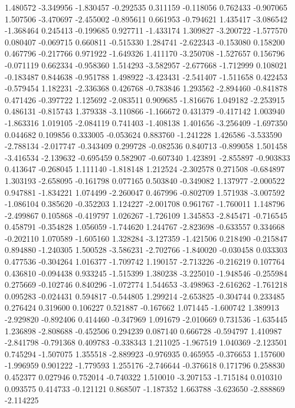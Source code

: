 1.480572
-3.349956
-1.830457
-0.292535
0.311159
-0.118056
0.762433
-0.907065
1.507506
-3.470697
-2.455002
-0.895611
0.661953
-0.794621
1.435417
-3.086542
-1.368464
0.245413
-0.199685
0.927711
-1.433174
1.309827
-3.200722
-1.577570
0.080407
-0.069715
0.660811
-0.515330
1.284741
-2.622343
-0.153080
0.158200
0.467796
-0.217766
0.971922
-1.649326
1.411170
-3.250708
-1.527657
0.156796
-0.071119
0.662334
-0.958360
1.514293
-3.582957
-2.677668
-1.712999
0.108021
-0.183487
0.844638
-0.951788
1.498922
-3.423431
-2.541407
-1.511658
0.422453
-0.579454
1.182231
-2.336368
0.426768
-0.783846
1.293562
-2.894460
-0.841878
0.471426
-0.397722
1.125692
-2.083511
0.909685
-1.816676
1.049182
-2.253915
0.486131
-0.815743
1.379338
-3.110866
-1.166672
0.431379
-0.417142
1.003940
-1.863316
1.019105
-2.084119
0.741403
-1.408138
1.401656
-3.256409
-1.697350
0.044682
0.109856
0.333005
-0.053624
0.883760
-1.241228
1.426586
-3.533590
-2.788134
-2.017747
-0.343409
0.299728
-0.082536
0.840713
-0.899058
1.501458
-3.416534
-2.139632
-0.695459
0.582907
-0.607340
1.423891
-2.855897
-0.903833
0.413647
-0.268045
1.111140
-1.818148
1.212524
-2.302578
0.271508
-0.684897
1.303193
-2.658095
-0.161798
0.077165
0.503840
-0.349082
1.137977
-2.000522
0.947881
-1.834221
1.074499
-2.260047
0.467996
-0.802709
1.571938
-3.007592
-1.086104
0.385620
-0.352203
1.124227
-2.001708
0.961767
-1.760011
1.148796
-2.499867
0.105868
-0.419797
1.026267
-1.726109
1.345853
-2.845471
-0.716545
0.458791
-0.354828
1.056059
-1.744620
1.244767
-2.823698
-0.633557
0.334668
-0.202110
1.070589
-1.605160
1.328284
-3.127359
-1.421506
0.218490
-0.215847
0.894880
-1.240305
1.500528
-3.586231
-2.702766
-1.840020
-0.030458
0.033303
0.477536
-0.304264
1.016377
-1.709742
1.190157
-2.713226
-0.216219
0.107764
0.436810
-0.094438
0.933245
-1.515399
1.380238
-3.225010
-1.948546
-0.255984
0.275669
-0.102746
0.840296
-1.072774
1.544653
-3.498963
-2.616262
-1.761218
0.095283
-0.024431
0.594817
-0.544805
1.299214
-2.653825
-0.304744
0.233485
0.276424
0.319600
0.106227
0.521887
-0.167662
1.071445
-1.600742
1.389913
-2.929820
-0.892406
0.414460
-0.347969
1.091679
-2.010669
0.731536
-1.635445
1.236898
-2.808688
-0.452506
0.294239
0.087140
0.666728
-0.594797
1.410987
-2.841798
-0.791368
0.409783
-0.338343
1.211025
-1.967519
1.040369
-2.123501
0.745294
-1.507075
1.355518
-2.889923
-0.976935
0.465955
-0.376653
1.157600
-1.996959
0.901222
-1.779593
1.255176
-2.746644
-0.376618
0.171796
0.258830
0.452377
0.027946
0.752014
-0.740322
1.510010
-3.207153
-1.715184
0.010310
0.093575
0.414733
-0.121121
0.868507
-1.187352
1.663788
-3.623650
-2.888869
-2.114225
